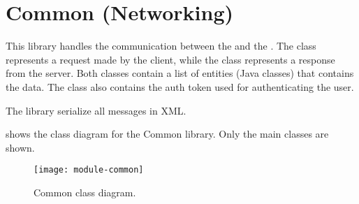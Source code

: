 \section{Common (Networking)}\label{sec:common}

This library handles the communication between the  and the
. The  class represents a request made by the
client, while the  class represents a response from the
server. Both classes contain a list of entities (Java classes) that contains the
data. The  class also contains the auth token used for
authenticating the user.

The library serialize all messages in XML\@.

 shows the class diagram for the Common library. Only the
main classes are shown.

\begin{figure}[htb]
	\texttt{[image: module-common]}
	\caption{Common class diagram.}\label{fig:common}
\end{figure}
